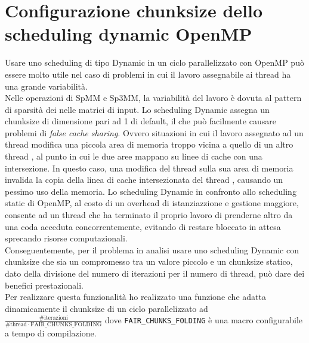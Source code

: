 \section{Configurazione chunksize dello scheduling dynamic OpenMP} \label{chSpMMAux:dynChunkFairAdapting}
Usare uno scheduling di tipo Dynamic in un ciclo parallelizzato con OpenMP 
può essere molto utile nel caso di problemi in cui il lavoro assegnabile ai thread ha una grande variabilità.\\
Nelle operazioni di SpMM e Sp3MM, la variabilità del lavoro è dovuta 
al pattern di sparsità dei \nnz nelle matrici di input.
\voidLine
Lo scheduling Dynamic assegna un chunksize di dimensione pari ad 1 di default, 
il che può facilmente causare problemi di \emph{false cache sharing}.
Ovvero situazioni in cui il lavoro assegnato ad un thread  modifica una piccola area di memoria
troppo vicina a quello di un altro thread , 
al punto in cui le due aree mappano su linee di cache con una intersezione. 
In questo caso, una modifica del thread  sulla sua area di memoria invalida la 
copia della linea di cache intersezionata del thread , causando un pessimo uso della memoria.
\voidLine
Lo scheduling Dynamic in confronto allo scheduling static di OpenMP, al costo di un overhead di istanziazzione e gestione maggiore,
consente ad un thread che ha terminato il proprio lavoro di prenderne altro da una coda acceduta concorrentemente,
evitando di restare bloccato in attesa sprecando risorse computazionali.\\
Conseguentemente, per il problema in analisi usare uno scheduling Dynamic con chunksize che sia un compromesso tra un valore piccolo e un 
chunksize statico, dato della divisione del numero di iterazioni per il numero di thread,
può dare dei benefici prestazionali.\\
Per realizzare questa funzionalità ho realizzato una funzione che adatta dinamicamente 
il chunksize di un ciclo parallelizzato ad \\
$\frac{\#\text{iterazioni}}{\# \text{thread} \cdot \text{FAIR\_CHUNKS\_FOLDING}}$
dove \verb|FAIR_CHUNKS_FOLDING| è una macro configurabile a tempo di compilazione.\\

